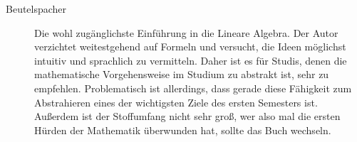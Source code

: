 \begin{description}
\item[Beutelspacher]{
		Die wohl zugänglichste Einführung in die Lineare Algebra. Der Autor verzichtet weitestgehend auf Formeln und versucht, die Ideen möglichst intuitiv und sprachlich zu vermitteln. Daher ist es für Studis, denen die mathematische Vorgehensweise im Studium zu abstrakt ist, sehr zu empfehlen. Problematisch ist allerdings, dass gerade diese Fähigkeit zum Abstrahieren eines der wichtigsten Ziele des ersten Semesters ist. Außerdem ist der Stoffumfang nicht sehr groß, wer also mal die ersten Hürden der Mathematik überwunden hat, sollte das Buch wechseln.}







\end{description}
